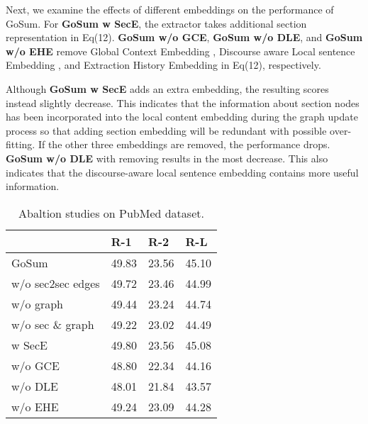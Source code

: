 \documentclass[11pt,a4paper]{article}
\begin{document}
Next, we examine the effects of different embeddings on the performance of GoSum.
For \textbf{GoSum w SecE}, the extractor takes additional section representation  in Eq(12).
\textbf{GoSum w/o GCE}, \textbf{GoSum w/o DLE}, and \textbf{GoSum w/o EHE}
remove Global Context Embedding , Discourse aware Local sentence Embedding , and Extraction History Embedding  in Eq(12), respectively.

Although \textbf{GoSum w SecE} adds an extra embedding, the resulting scores instead slightly decrease. This indicates that the information about section nodes has been incorporated into the local content embedding during the graph update process so that adding section embedding will be redundant with possible over-fitting.
If the other three embeddings are removed, the performance drops. \textbf{GoSum w/o DLE} with removing  results in the most decrease. This  also indicates that the discourse-aware local sentence embedding contains more useful information.

\begin{table}[t]
  \centering
  \begin{tabular}{l|p{13mm}p{13mm}p{13mm}}\toprule
                              & \hfil R-1  & \hfil R-2  & \hfil R-L    \\ \midrule
        GoSum                 & \hfil 49.83 & \hfil 23.56 & \hfil 45.10   \\ \midrule
        \quad w/o sec2sec edges     & \hfil 49.72 & \hfil 23.46 & \hfil 44.99   \\
        \quad w/o graph             & \hfil 49.44 & \hfil 23.24 & \hfil 44.74   \\
        \quad w/o sec \& graph      & \hfil 49.22 & \hfil 23.02 & \hfil 44.49   \\ \midrule
        \quad w   SecE              & \hfil 49.80 & \hfil 23.56 & \hfil 45.08   \\
        \quad w/o GCE               & \hfil 48.80 & \hfil 22.34 & \hfil 44.16   \\
        \quad w/o DLE               & \hfil 48.01 & \hfil 21.84 & \hfil 43.57   \\
        \quad w/o EHE               & \hfil 49.24 & \hfil 23.09 & \hfil 44.28   \\ \bottomrule
  \end{tabular}
  \caption{Abaltion studies on PubMed dataset.} \label{tab:ablation_pubmed}
\end{table}
\end{document}
